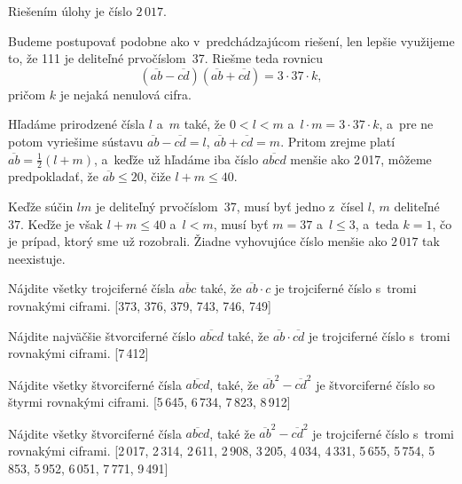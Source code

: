 {\odpoved
Riešením úlohy je číslo $2\,017$.

\ineres
Budeme postupovať podobne ako v~predchádzajúcom riešení, len lepšie využijeme
to, že 111 je deliteľné prvočíslom~37. Riešme teda rovnicu
$$
(\overline {ab}-\overline {cd}) (\overline {ab}+\overline {cd}) = 3 \cdot 37 \cdot k,
$$
pričom $k$ je nejaká nenulová cifra.

Hľadáme prirodzené čísla $l$ a~$m$ také, že
$0<l<m$ a~$l \cdot m=3 \cdot 37 \cdot k$, a~pre ne potom vyriešime sústavu
$\overline {ab}-\overline {cd}=l$, $\overline {ab}+\overline {cd}=m$.
Pritom zrejme platí $\overline {ab} = \frac12(l+m)$, a~keďže
už hľadáme iba číslo $\overline {abcd}$ menšie ako 2\,017, môžeme predpokladať,
že $\overline {ab} \leq 20$, čiže $l+m \leq 40$.

Keďže súčin $lm$ je deliteľný prvočíslom~37, musí byť jedno z~čísel $l$, $m$
deliteľné~$37$. Keďže je však $l+m \leq 40$ a~$l<m$, musí byť $m=37$ a~$l\le3$,
a~teda $k= 1$, čo je prípad, ktorý sme už rozobrali.
Žiadne vyhovujúce číslo menšie ako $2\,017$ tak neexistuje.

Nájdite všetky trojciferné čísla $\overline {abc}$ také, že
$\overline {ab} \cdot c$ je trojciferné číslo s~tromi rovnakými
ciframi. [373, 376, 379, 743, 746, 749]

Nájdite najväčšie štvorciferné číslo $\overline {abcd}$ také, že
$\overline {ab} \cdot \overline {cd}$ je trojciferné číslo s~tromi
rovnakými ciframi. [7\,412]

\D
Nájdite všetky štvorciferné čísla $\overline {abcd}$, také, že
$\overline {ab}^2- \overline {cd}^2$ je štvorciferné číslo so štyrmi
rovnakými ciframi. [5\,645, 6\,734, 7\,823, 8\,912]

Nájdite všetky štvorciferné čísla $\overline {abcd}$, také že
$\overline {ab}^2- \overline {cd}^2$ je trojciferné číslo s~tromi
rovnakými ciframi. [2\,017, 2\,314, 2\,611, 2\,908, 3\,205, 4\,034, 4\,331, 5\,655,
5\,754, 5\,853, 5\,952, 6\,051, 7\,771, 9\,491]
}

